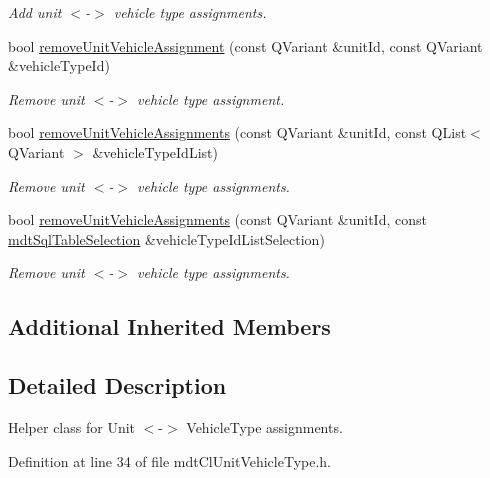 \begin{DoxyCompactItemize}
\begin{DoxyCompactList}\small\item\em Add unit $<$-\/$>$ vehicle type assignments. \end{DoxyCompactList}\item 
bool \hyperlink{classmdt_cl_unit_vehicle_type_a399321985befccc70d82a2aff09c409e}{remove\-Unit\-Vehicle\-Assignment} (const Q\-Variant \&unit\-Id, const Q\-Variant \&vehicle\-Type\-Id)
\begin{DoxyCompactList}\small\item\em Remove unit $<$-\/$>$ vehicle type assignment. \end{DoxyCompactList}\item 
bool \hyperlink{classmdt_cl_unit_vehicle_type_a18480c7eb4f54f4006747d17c18679e5}{remove\-Unit\-Vehicle\-Assignments} (const Q\-Variant \&unit\-Id, const Q\-List$<$ Q\-Variant $>$ \&vehicle\-Type\-Id\-List)
\begin{DoxyCompactList}\small\item\em Remove unit $<$-\/$>$ vehicle type assignments. \end{DoxyCompactList}\item 
bool \hyperlink{classmdt_cl_unit_vehicle_type_a3e97833e0489fe75bb50968e7d9db906}{remove\-Unit\-Vehicle\-Assignments} (const Q\-Variant \&unit\-Id, const \hyperlink{classmdt_sql_table_selection}{mdt\-Sql\-Table\-Selection} \&vehicle\-Type\-Id\-List\-Selection)
\begin{DoxyCompactList}\small\item\em Remove unit $<$-\/$>$ vehicle type assignments. \end{DoxyCompactList}\end{DoxyCompactItemize}
\subsection*{Additional Inherited Members}


\subsection{Detailed Description}
Helper class for Unit $<$-\/$>$ Vehicle\-Type assignments. 

Definition at line 34 of file mdt\-Cl\-Unit\-Vehicle\-Type.\-h.



